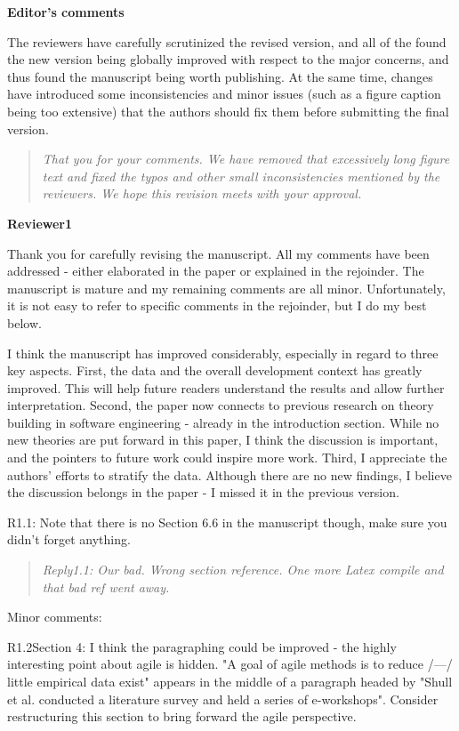 \documentclass[smallcondensed]{svjour3}
\begin{document}
 
{\bf Editor's comments}
 
The reviewers have carefully scrutinized the revised version, and all of the found the new version being globally improved with respect to the major concerns, and thus found the manuscript being worth publishing. At the same time, changes have introduced some inconsistencies and minor issues (such as a figure caption being too extensive) that the authors should fix them before submitting the final version.

\begin{quote}{\em  That you for your comments. We have removed that excessively long figure text and fixed the typos and other small inconsistencies mentioned by the reviewers. We hope this revision meets with your approval.
}\end{quote}

{\bf Reviewer1}

Thank you for carefully revising the manuscript. All my comments have been addressed - either elaborated in the paper or explained in the rejoinder. The manuscript is mature and my remaining comments are all minor. Unfortunately, it is not easy to refer to specific comments in the rejoinder, but I do my best below.

I think the manuscript has improved considerably, especially in regard to three key aspects. First, the data and the overall development context has greatly improved. This will help future readers understand the results and allow further interpretation. Second, the paper now connects to previous research on theory building in software engineering - already in the introduction section. While no new theories are put forward in this paper, I think the discussion is important, and the pointers to future work could inspire more work. Third, I appreciate the authors' efforts to stratify the data. Although there are no new findings, I believe the discussion belongs in the paper - I missed it in the previous version.

R1.1: Note that there is no Section 6.6 in the manuscript though, make sure you didn't forget anything.

\begin{quote}{\em Reply1.1: Our bad. Wrong section reference. One more Latex compile and that bad ref went away.
}\end{quote}

Minor comments:

R1.2Section 4: I think the paragraphing could be improved - the highly interesting point about agile is hidden. "A goal of agile methods is to reduce /---/ little empirical data exist" appears in the middle of a paragraph headed by "Shull et al. conducted a literature survey and held a series of e-workshops". Consider restructuring this section to bring forward the agile perspective.
\end{document}
